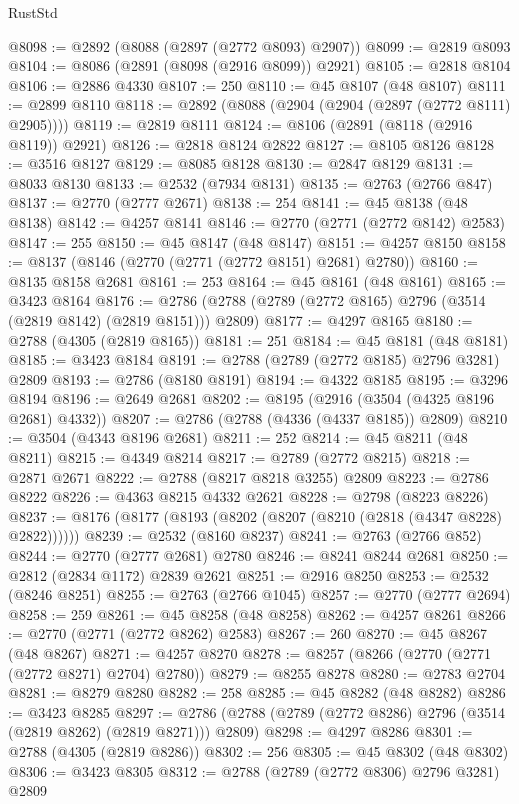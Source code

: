 \begin{lexlean}{RustStd}
\begin{coremodule}
@8098 := @2892 (@8088 (@2897 (@2772 @8093) @2907))
@8099 := @2819 @8093
@8104 := @8086 (@2891 (@8098 (@2916 @8099)) @2921)
@8105 := @2818 @8104
@8106 := @2886 @4330
@8107 := 250
@8110 := @45 @8107 (@48 @8107)
@8111 := @2899 @8110
@8118 := @2892 (@8088 (@2904 (@2904 (@2897 (@2772 @8111) @2905))))
@8119 := @2819 @8111
@8124 := @8106 (@2891 (@8118 (@2916 @8119)) @2921)
@8126 := @2818 @8124 @2822
@8127 := @8105 @8126
@8128 := @3516 @8127
@8129 := @8085 @8128
@8130 := @2847 @8129
@8131 := @8033 @8130
@8133 := @2532 (@7934 @8131)
@8135 := @2763 (@2766 @847)
@8137 := @2770 (@2777 @2671)
@8138 := 254
@8141 := @45 @8138 (@48 @8138)
@8142 := @4257 @8141
@8146 := @2770 (@2771 (@2772 @8142) @2583)
@8147 := 255
@8150 := @45 @8147 (@48 @8147)
@8151 := @4257 @8150
@8158 := @8137 (@8146 (@2770 (@2771 (@2772 @8151) @2681) @2780))
@8160 := @8135 @8158 @2681
@8161 := 253
@8164 := @45 @8161 (@48 @8161)
@8165 := @3423 @8164
@8176 := @2786 (@2788 (@2789 (@2772 @8165) @2796 (@3514 (@2819 @8142) (@2819 @8151))) @2809)
@8177 := @4297 @8165
@8180 := @2788 (@4305 (@2819 @8165))
@8181 := 251
@8184 := @45 @8181 (@48 @8181)
@8185 := @3423 @8184
@8191 := @2788 (@2789 (@2772 @8185) @2796 @3281) @2809
@8193 := @2786 (@8180 @8191)
@8194 := @4322 @8185
@8195 := @3296 @8194
@8196 := @2649 @2681
@8202 := @8195 (@2916 (@3504 (@4325 @8196 @2681) @4332))
@8207 := @2786 (@2788 (@4336 (@4337 @8185)) @2809)
@8210 := @3504 (@4343 @8196 @2681)
@8211 := 252
@8214 := @45 @8211 (@48 @8211)
@8215 := @4349 @8214
@8217 := @2789 (@2772 @8215)
@8218 := @2871 @2671
@8222 := @2788 (@8217 @8218 @3255) @2809
@8223 := @2786 @8222
@8226 := @4363 @8215 @4332 @2621
@8228 := @2798 (@8223 @8226)
@8237 := @8176 (@8177 (@8193 (@8202 (@8207 (@8210 (@2818 (@4347 @8228) @2822))))))
@8239 := @2532 (@8160 @8237)
@8241 := @2763 (@2766 @852)
@8244 := @2770 (@2777 @2681) @2780
@8246 := @8241 @8244 @2681
@8250 := @2812 (@2834 @1172) @2839 @2621
@8251 := @2916 @8250
@8253 := @2532 (@8246 @8251)
@8255 := @2763 (@2766 @1045)
@8257 := @2770 (@2777 @2694)
@8258 := 259
@8261 := @45 @8258 (@48 @8258)
@8262 := @4257 @8261
@8266 := @2770 (@2771 (@2772 @8262) @2583)
@8267 := 260
@8270 := @45 @8267 (@48 @8267)
@8271 := @4257 @8270
@8278 := @8257 (@8266 (@2770 (@2771 (@2772 @8271) @2704) @2780))
@8279 := @8255 @8278
@8280 := @2783 @2704
@8281 := @8279 @8280
@8282 := 258
@8285 := @45 @8282 (@48 @8282)
@8286 := @3423 @8285
@8297 := @2786 (@2788 (@2789 (@2772 @8286) @2796 (@3514 (@2819 @8262) (@2819 @8271))) @2809)
@8298 := @4297 @8286
@8301 := @2788 (@4305 (@2819 @8286))
@8302 := 256
@8305 := @45 @8302 (@48 @8302)
@8306 := @3423 @8305
@8312 := @2788 (@2789 (@2772 @8306) @2796 @3281) @2809

\end{coremodule}
\end{lexlean}
